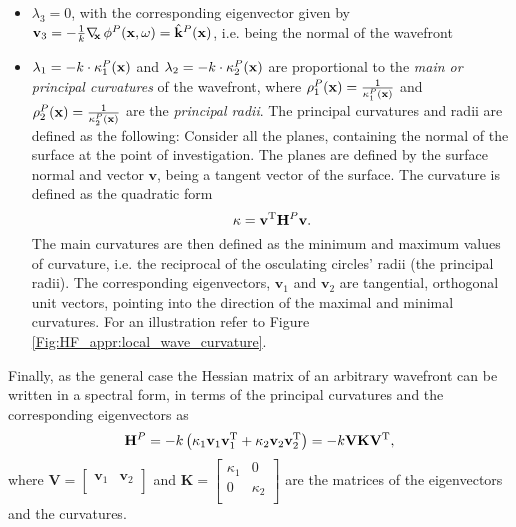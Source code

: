 \begin{itemize}
\item $\lambda_3 = 0$, with the corresponding eigenvector given by $\mathbf{v}_3 = - \frac{1}{k} \nabla_{\!\!\mathbf{x}}\, \phi^P(\mathbf{x},\omega) = \hat{\mathbf{k}}^P(\mathbf{x})$, i.e. being the normal of the wavefront
\item $\lambda_1 = -k \cdot \kappa^P_1(\mathbf{x})$ and $\lambda_2 = -k \cdot	\kappa^P_2(\mathbf{x})$ are proportional to the \emph{main or principal curvatures} of the wavefront, where $\rho^P_1(\mathbf{x}) = \frac{1}{\kappa^P_1(\mathbf{x})}$ and $\rho^P_2(\mathbf{x}) = \frac{1}{\kappa^P_2(\mathbf{x})}$ are the \emph{principal radii}.
The principal curvatures and radii are defined as the following:
Consider all the planes, containing the normal of the surface at the point of investigation. The planes are defined by the surface normal and vector $\mathbf{v}$, being a tangent vector of the surface.
The curvature is defined as the quadratic form 
\begin{equation}
\kappa = \mathbf{v}^{\mathrm{T}} \mathbf{H}^P \mathbf{v}.
\label{Eq:App:curvature_def}
\end{equation}
The main curvatures are then defined as the minimum and maximum values of curvature, i.e. the reciprocal of the osculating circles' radii (the principal radii).
The corresponding eigenvectors, $\mathbf{v}_1$ and $\mathbf{v}_2$ are tangential, orthogonal unit vectors, pointing into the direction of the maximal and minimal curvatures.
For an illustration refer to Figure \ref{Fig:HF_appr:local_wave_curvature}.
\end{itemize}
Finally, as the general case the Hessian matrix of an arbitrary wavefront can be written in a spectral form, in terms of the principal curvatures and the corresponding eigenvectors as
\begin{equation}
\mathbf{H}^P = -k \left( \kappa_1  \mathbf{v}_1 \mathbf{v}_1^\mathrm{T} + \kappa_2 \mathbf{v}_2 \mathbf{v}_2^\mathrm{T} \right) = -k \mathbf{V} \mathbf{K} \mathbf{V}^{\mathrm{T}},
\label{Eq:App:Hessian_w_curvature}
\end{equation}
where $\mathbf{V} = \begin{bmatrix} \mathbf{v}_1 & \mathbf{v}_2 \\\end{bmatrix}$ and $\mathbf{K} = \begin{bmatrix} \kappa_1 & 0 \\[.0em] 0 & \kappa_2 \\[0.0em] \end{bmatrix}$ are the matrices of the eigenvectors and the curvatures.

